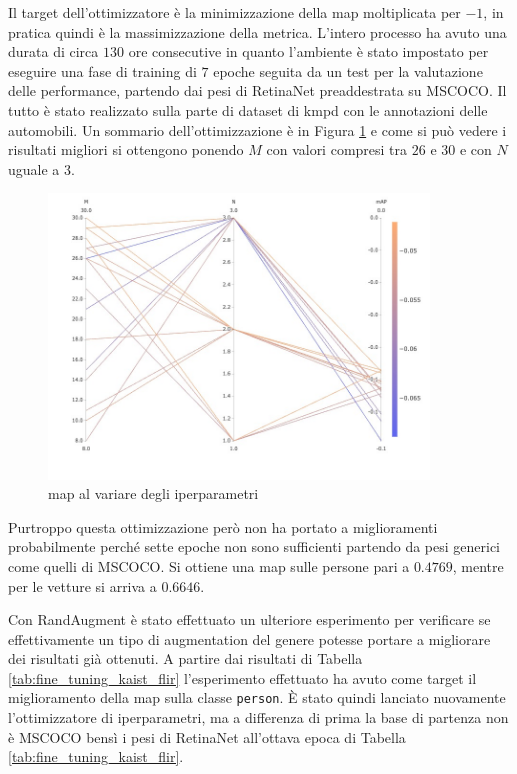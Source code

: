 Il target dell'ottimizzatore è la minimizzazione della \ac{map} moltiplicata per $-1$, in pratica quindi è la massimizzazione della metrica. L'intero processo ha avuto una durata di circa $130$ ore consecutive in quanto l'ambiente è stato impostato per eseguire una fase di training di $7$ epoche seguita da un test per la valutazione delle performance, partendo dai pesi di RetinaNet preaddestrata su \ac{MSCOCO}. Il tutto è stato realizzato sulla parte di dataset di \ac{kmpd} con le annotazioni delle automobili. Un sommario dell'ottimizzazione è in Figura \ref{fig:map_comet_ml} e come si può vedere i risultati migliori si ottengono ponendo $M$ con valori compresi tra $26$ e $30$ e con $N$ uguale a $3$.
\begin{figure}[]
    \centering
    \includegraphics[width=0.9\textwidth]{images/graphic/mAP_comet.jpeg}
    \caption{\ac{map} al variare degli iperparametri}
    \label{fig:map_comet_ml}
\end{figure}

Purtroppo questa ottimizzazione però non ha portato a miglioramenti probabilmente perché sette epoche non sono sufficienti partendo da pesi generici come quelli di \ac{MSCOCO}. Si ottiene una \ac{map} sulle persone pari a $0.4769$, mentre per le vetture si arriva a $0.6646$. 

Con RandAugment è stato effettuato un ulteriore esperimento per verificare se effettivamente un tipo di augmentation del genere potesse portare a migliorare dei risultati già ottenuti. A partire dai risultati di Tabella \ref{tab:fine_tuning_kaist_flir} l'esperimento effettuato ha avuto come target il miglioramento della \ac{map} sulla classe \texttt{person}. 
È stato quindi lanciato nuovamente l'ottimizzatore di iperparametri, ma a differenza di prima la base di partenza non è \ac{MSCOCO} bensì i pesi di RetinaNet all'ottava epoca di Tabella \ref{tab:fine_tuning_kaist_flir}. 

